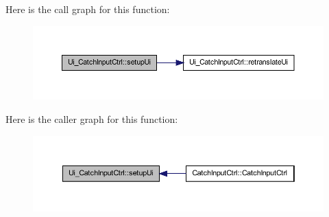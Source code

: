 Here is the call graph for this function:\nopagebreak
\begin{figure}[H]
\begin{center}
\leavevmode
\includegraphics[width=400pt]{class_ui___catch_input_ctrl_aac3148ff222d28ab8911bf1dd9f2a7d5_cgraph}
\end{center}
\end{figure}




Here is the caller graph for this function:\nopagebreak
\begin{figure}[H]
\begin{center}
\leavevmode
\includegraphics[width=394pt]{class_ui___catch_input_ctrl_aac3148ff222d28ab8911bf1dd9f2a7d5_icgraph}
\end{center}
\end{figure}




